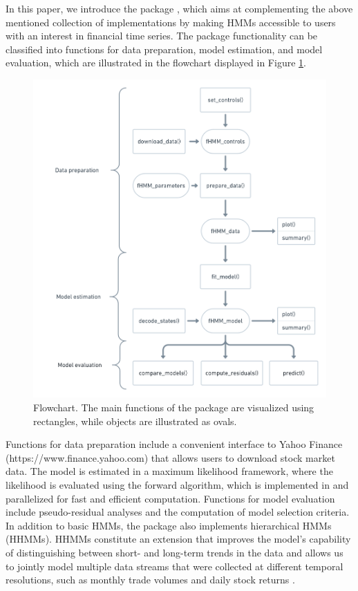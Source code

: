 \documentclass[article,shortnames]{jss}
\begin{document}
In this paper, we introduce the  package  \citep{oel22}, which aims at complementing the above mentioned collection of implementations by making HMMs accessible to  users with an interest in financial time series. The package functionality can be classified into functions for data preparation, model estimation, and model evaluation, which are illustrated in the flowchart displayed in Figure \ref{fig:flowchart}. 
\begin{figure}[t!]
  \includegraphics{flowchart.png}
  \caption{Flowchart. The main functions of the  package are visualized using rectangles, while objects are illustrated as ovals.}
  \label{fig:flowchart}
\end{figure}
Functions for data preparation include a convenient interface to Yahoo Finance (https://www.finance.yahoo.com) that allows users to download stock market data. The model is estimated in a maximum likelihood framework, where the likelihood is evaluated using the forward algorithm, which is implemented in  and parallelized for fast and efficient computation. Functions for model evaluation include pseudo-residual analyses and the computation of model selection criteria. In addition to basic HMMs, the package also implements hierarchical HMMs (HHMMs). HHMMs \citep{oel21} constitute an extension that improves the model's capability of distinguishing between short- and long-term trends in the data and allows us to jointly model multiple data streams that were collected at different temporal resolutions, such as monthly trade volumes and daily stock returns \citep{ada20}. 
\end{document}
